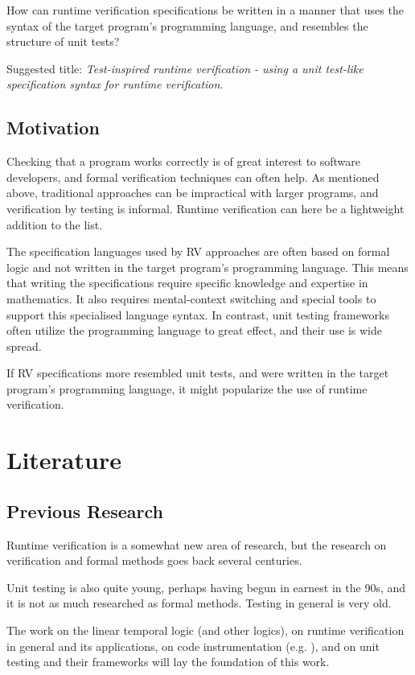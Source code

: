 \documentclass[a4paper,11pt]{article}
\begin{document}
How can runtime verification specifications be written in a manner that uses the syntax of
the target program's programming language, and resembles the structure of unit tests?

Suggested title: \textit{Test-inspired runtime verification - using a unit test-like specification syntax for runtime verification}.


\subsection{Motivation}

Checking that a program works correctly is of great interest to software developers, and
formal verification techniques can often help. As mentioned above, traditional approaches
can be impractical with larger programs, and verification by testing is informal.
Runtime verification can here be a lightweight addition to the list.

The specification languages used by RV approaches are often based
on formal logic and not written in the target program's programming language. 
This means that writing the specifications require specific knowledge and expertise in mathematics. 
It also requires mental-context switching and special tools
to support this specialised language syntax. In contrast, unit testing frameworks often
utilize the programming language to great effect, and their use is wide spread.

If RV specifications more resembled unit tests, and were written in the target program's
programming language, it might popularize the use of runtime verification.


\section{Literature}

\subsection{Previous Research}

Runtime verification is a somewhat new area of research, but the research on verification and formal methods goes back several centuries.

Unit testing is also quite young, perhaps having begun in earnest in the 90s, and it is not as much researched as formal methods. Testing in general is very old.

The work on the linear temporal logic (and other logics), on runtime verification in general and its applications, on code instrumentation (e.g. \cite{aspectj,matusiak09}), and on unit testing and their frameworks will lay the foundation of this work.
\end{document}

